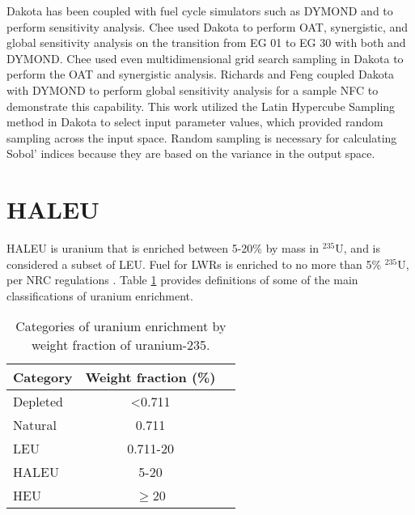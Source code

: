 Dakota has been coupled with fuel cycle simulators such as \gls{DYMOND} 
\cite{richards_application_2021} and \Cyclus \cite{chee_sensitivity_2019} 
to perform sensitivity 
analysis. Chee \cite{chee_sensitivity_2019} used Dakota to perform 
\gls{OAT}, synergistic, and global sensitivity analysis on the transition 
from \gls{EG} 01 to \gls{EG} 30 with both \Cyclus and \gls{DYMOND}. Chee used even 
multidimensional grid search sampling in Dakota to perform the \gls{OAT} 
and synergistic analysis. 
Richards and Feng \cite{richards_application_2021} coupled Dakota with 
\gls{DYMOND} to perform global sensitivity analysis for a sample \gls{NFC} 
to demonstrate this capability. This work utilized the Latin Hypercube 
Sampling method in Dakota to select input parameter values, which provided
random sampling across the input space. Random sampling is necessary for 
calculating Sobol' indices because they are based on the variance in 
the output space. 


%
%
%
\section{HALEU}
\gls{HALEU} is uranium that is enriched between 5-20\% by mass in 
$^{235}$U, and is considered a subset of \gls{LEU}. Fuel for \glspl{LWR} 
is enriched to no more than 5\% $^{235}$U, per \gls{NRC} regulations 
\cite{noauthor_10_2006}. Table \ref{tab:enrichemnt} provides definitions 
of some of the main classifications of uranium enrichment. 

\begin{table}[ht]
    \centering
    \caption{Categories of uranium enrichment by weight fraction of 
    uranium-235.}
    \label{tab:enrichemnt}
    \begin{tabular}{l c c}
        \hline
        Category & Weight fraction (\%)\\\hline
        Depleted & <0.711 \\
        Natural & 0.711 \\
        \gls{LEU} & 0.711-20 \\
        \gls{HALEU} & 5-20 \\
        \gls{HEU} & $\ge$20 \\
        \hline
    \end{tabular}
\end{table}

